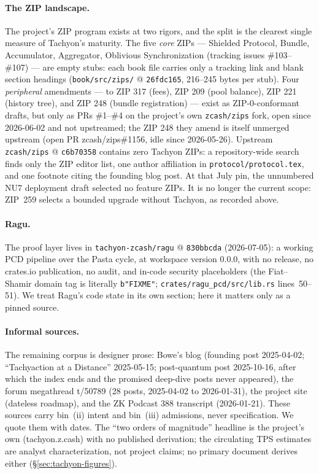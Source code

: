 \documentclass[11pt,a4paper]{article}
\theoremstyle{definition}
\begin{document}
\paragraph{The ZIP landscape.} The project's ZIP program exists at two rigors,
and the split is the clearest single measure of Tachyon's maturity. The five
\emph{core} ZIPs --- Shielded Protocol, Bundle, Accumulator, Aggregator,
Oblivious Synchronization (tracking issues \#103--\#107) --- are empty stubs:
each book file carries only a tracking link and blank section headings
(\texttt{book/src/zips/} @ \texttt{26fdc165}, 216--245 bytes per stub). Four
\emph{peripheral} amendments --- to ZIP 317 (fees), ZIP 209 (pool balance),
ZIP 221 (history tree), and ZIP 248 (bundle registration) --- exist as
ZIP-0-conformant drafts, but only as PRs \#1--\#4 on the project's own
\texttt{zcash/zips} fork, open since 2026-06-02 and not upstreamed; the ZIP
248 they amend is itself unmerged upstream (open PR zcash/zips\#1156, idle
since 2026-05-26). Upstream \texttt{zcash/zips} @ \texttt{c6b70358} contains
zero Tachyon ZIPs: a repository-wide search finds only the ZIP editor list,
one author affiliation in \texttt{protocol/protocol.tex}, and one footnote
citing the founding blog post. At that July pin, the unnumbered NU7
deployment draft selected no feature ZIPs. It is no longer the current
scope: ZIP~259 selects a bounded upgrade without Tachyon, as recorded above.

\paragraph{Ragu.} The proof layer lives in \texttt{tachyon-zcash/ragu}
@ \texttt{830bbcda} (2026-07-05): a working PCD pipeline over the Pasta cycle,
at workspace version 0.0.0, with no release, no crates.io publication, no
audit, and in-code security placeholders (the Fiat--Shamir domain tag is
literally \texttt{b"FIXME"}; \texttt{crates/ragu\_pcd/src/lib.rs}
lines~50--51).
We treat Ragu's code state in its own section; here it matters only as a
pinned source.

\paragraph{Informal sources.} The remaining corpus is designer prose: Bowe's
blog (founding post 2025-04-02; ``Tachyaction at a Distance'' 2025-05-15;
post-quantum post 2025-10-16, after which the index ends and the promised
deep-dive posts never appeared), the forum megathread t/50789 (28 posts,
2025-04-02 to 2026-01-31), the project site (dateless roadmap), and the ZK
Podcast 388 transcript (2026-01-21). These sources carry bin~(ii) intent and
bin~(iii) admissions, never specification. We quote them with dates. The
``two orders of magnitude'' headline is the project's own (tachyon.z.cash)
with no published derivation; the circulating TPS estimates are analyst
characterization, not project claims; no primary document derives either
(\S\ref{sec:tachyon-figures}).
\end{document}
